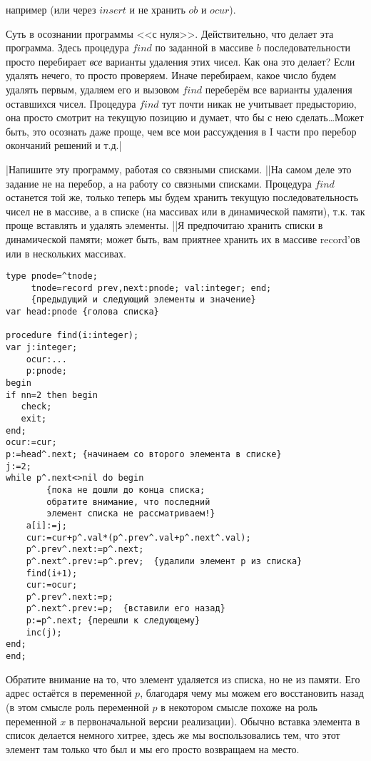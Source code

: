 например (или через $insert$ и не хранить $ob$ и $ocur$).

Суть в осознании программы <<с нуля>>. Действительно, что делает эта программа. 
Здесь процедура $find$ по заданной в массиве $b$ последовательности просто перебирает \textit{все} варианты удаления этих чисел.
Как она это делает? Если удалять нечего, то просто проверяем. Иначе перебираем, 
какое число будем удалять первым, удаляем его и вызовом $find$ переберём все 
варианты удаления оставшихся чисел. Процедура $find$ тут почти никак не учитывает предысторию, она просто смотрит на текущую позицию и думает, что бы с нею сделать\dots Может быть, это осознать даже проще, чем 
все мои рассуждения в I части про перебор окончаний решений и т.д.|

\task|Напишите эту программу, работая со связными списками.
||На самом деле это задание не на перебор, а на работу со связными списками. Процедура $find$ останется той же, только теперь мы будем хранить текущую последовательность чисел не в массиве, а в списке (на массивах или в динамической памяти), т.к. так проще вставлять и удалять элементы.
||Я предпочитаю хранить списки в динамической памяти; может быть, вам приятнее хранить их в массиве record'ов или в нескольких массивах. 

\begin{codesample}\begin{verbatim}
type pnode=^tnode;
     tnode=record prev,next:pnode; val:integer; end; 
     {предыдущий и следующий элементы и значение}
var head:pnode {голова списка}

procedure find(i:integer);
var j:integer;
    ocur:...
    p:pnode;
begin
if nn=2 then begin
   check;
   exit;
end;
ocur:=cur;
p:=head^.next; {начинаем со второго элемента в списке}
j:=2;
while p^.next<>nil do begin 
        {пока не дошли до конца списка; 
        обратите внимание, что последний 
        элемент списка не рассматриваем!}
    a[i]:=j;
    cur:=cur+p^.val*(p^.prev^.val+p^.next^.val);
    p^.prev^.next:=p^.next;
    p^.next^.prev:=p^.prev;  {удалили элемент p из списка}
    find(i+1);
    cur:=ocur;
    p^.prev^.next:=p;
    p^.next^.prev:=p;  {вставили его назад}
    p:=p^.next; {перешли к следующему}
    inc(j);
end;
end;
\end{verbatim}\end{codesample}

Обратите внимание на то, что элемент удаляется из списка, но не из памяти. Его адрес остаётся в переменной $p$, благодаря чему мы можем его восстановить назад (в этом смысле роль переменной $p$ в некотором смысле похоже на роль переменной $x$ в первоначальной версии реализации). Обычно вставка элемента в список делается немного хитрее, здесь же мы воспользовались тем, что этот элемент там только что был и мы его просто возвращаем на место.

